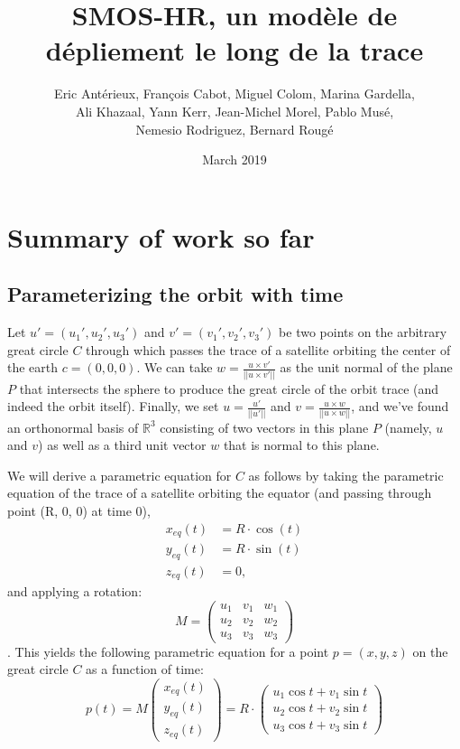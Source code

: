 \documentclass{article}
\title{SMOS-HR, un modèle de dépliement le long de la trace}
\author{Eric Antérieux, François Cabot, Miguel Colom, Marina Gardella,\\ Ali Khazaal,
Yann Kerr, Jean-Michel Morel, Pablo Musé,\\ Nemesio Rodriguez, Bernard Rougé }
\date{March 2019}
\begin{document}
\maketitle
\section{Summary of work so far}

\subsection{Parameterizing the orbit with time}
Let $u' = (u_1', u_2', u_3')$ and $v' = (v_1', v_2', v_3')$ be two points on the arbitrary great circle $C$ through which passes the trace of a satellite orbiting the center of the earth $c=(0,0,0)$. We can take $w = \frac{u \times v'}{||u \times v'||}$ as the unit normal of the plane $P$ that intersects the sphere to produce the great circle of the orbit trace (and indeed the orbit itself). Finally, we set $u = \frac{u'}{||u'||}$ and $v = \frac{u \times w}{||u \times w||}$, and we've found an orthonormal basis of $\mathbb{R}^3$ consisting of two vectors in this plane $P$ (namely, $u$ and $v$) as well as a third unit vector $w$ that is normal to this plane.

We will derive a parametric equation for $C$ as follows by taking the parametric equation of the trace of a satellite orbiting the equator (and passing through point (R, 0, 0) at time 0),
\begin{subequations}
\label{param}
\begin{align}
    x_{eq}(t) &= R \cdot \cos(t)\\
    y_{eq}(t) &= R \cdot \sin(t)\\
    z_{eq}(t) &= 0,
\end{align}
\end{subequations}and applying a rotation:
\begin{equation} M = 
\begin{pmatrix} 
u_1 & v_1 & w_1 \\
u_2 & v_2 & w_2 \\
u_3 & v_3 & w_3
\end{pmatrix}
\end{equation}. This yields the following parametric equation for a point $p = (x,y,z)$ on the great circle $C$ as a function of time:
\begin{equation}
    p(t) = M \begin{pmatrix}
    x_{eq}(t) \\
    y_{eq}(t) \\
    z_{eq}(t)
    \end{pmatrix} = R \cdot \begin{pmatrix} u_1 \cos t + v_1 \sin t \\
    u_2 \cos t + v_2 \sin t \\
    u_3 \cos t + v_3 \sin t
\end{pmatrix}
\end{equation}
\end{document}
